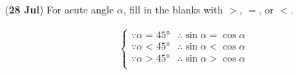 \documentclass[12pt,answers]{exam}
\newcommand{\qndate}[2]{(\textbf{#1 #2})}
\begin{document}
\begin{questions}
	\question \qndate{28}{Jul} For acute angle $\alpha$, fill in the blanks
	with $>$, $=$, or $<$.
	\begin{solution}
	\begin{align*}
		\begin{cases}
		\because \alpha = \ang{45} &\therefore \sin \alpha = \cos \alpha \\
		\because \alpha < \ang{45} &\therefore \sin \alpha < \cos \alpha \\
		\because \alpha > \ang{45} &\therefore \sin \alpha > \cos \alpha \\
		\end{cases}
	\end{align*}
	\end{solution}

\end{questions}
\end{document}
